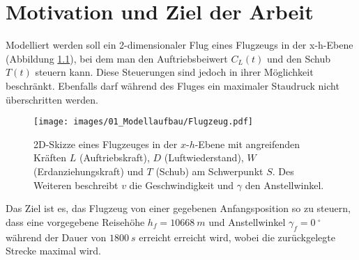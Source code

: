 \chapter{Motivation und Ziel der Arbeit}
Modelliert werden soll ein 2-dimensionaler Flug eines Flugzeugs in der x-h-Ebene (Abbildung \ref{img:Flugzeug}), bei dem man den Auftriebsbeiwert $C_L(t)$ und den Schub $T(t)$ steuern kann. Diese Steuerungen sind jedoch in ihrer Möglichkeit beschränkt. Ebenfalls darf während des Fluges ein maximaler Staudruck nicht überschritten werden.

\begin{figure}[H]
    \begin{center}
        \texttt{[image: images/01\_Modellaufbau/Flugzeug.pdf]}
        \caption{2D-Skizze eines Flugzeuges in der $x$-$h$-Ebene mit angreifenden Kräften $L$ (Auftriebskraft), $D$ (Luftwiederstand), $W$ (Erdanziehungskraft) und $T$ (Schub) am Schwerpunkt $S$. Des Weiteren beschreibt $v$ die Geschwindigkeit und $\gamma$ den Anstellwinkel.}\label{img:Flugzeug}
    \end{center}
\end{figure}

Das Ziel ist es, das Flugzeug von einer gegebenen Anfangsposition so zu steuern, dass eine vorgegebene Reisehöhe $h_f = 10668\ m$ und Anstellwinkel $\gamma_f = 0\ ^{\circ}$ während der Dauer von $1800 \ s$ erreicht erreicht wird, wobei die zurückgelegte Strecke maximal wird.

